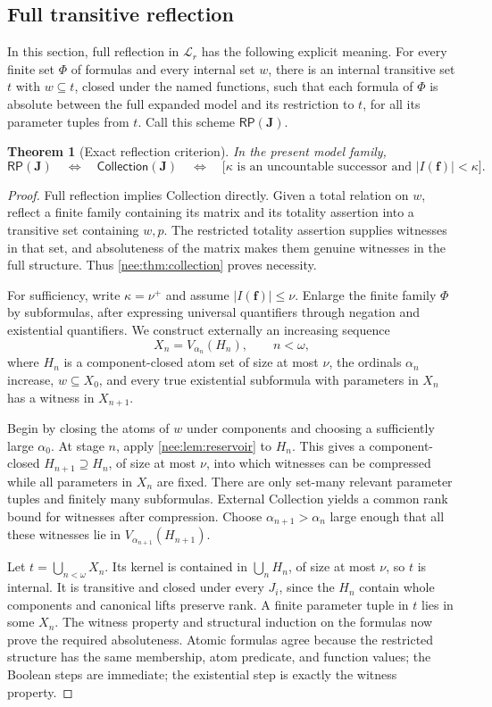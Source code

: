 \documentclass[11pt,letterpaper]{article}
\numberwithin{equation}{section}
\theoremstyle{plain}
\newtheorem{theorem}{Theorem}[section]
\theoremstyle{definition}
\theoremstyle{remark}
\newcommand{\Coll}{\mathsf{Collection}}
\newcommand{\RP}{\mathsf{RP}}
\newcommand{\Langr}{\mathcal L_r}
\begin{document}
\subsection{Full transitive reflection}
In this section, full reflection in $\Langr$ has the following explicit meaning. For every finite set $\Phi$ of formulas and every internal set $w$, there is an internal transitive set $t$ with $w\subseteq t$, closed under the named functions, such that each formula of $\Phi$ is absolute between the full expanded model and its restriction to $t$, for all its parameter tuples from $t$. Call this scheme $\RP(\boldsymbol J)$.

\begin{theorem}[Exact reflection criterion]\label{nee:thm:reflection}
In the present model family,
\[
\RP(\boldsymbol J)
\quad\Longleftrightarrow\quad
\Coll(\boldsymbol J)
\quad\Longleftrightarrow\quad
\bigl[\kappa\text{ is an uncountable successor and }|I(\boldsymbol f)|<\kappa\bigr].
\]
\end{theorem}
\begin{proof}
Full reflection implies Collection directly. Given a total relation on $w$, reflect a finite family containing its matrix and its totality assertion into a transitive set containing $w,p$. The restricted totality assertion supplies witnesses in that set, and absoluteness of the matrix makes them genuine witnesses in the full structure. Thus \cref{nee:thm:collection} proves necessity.

For sufficiency, write $\kappa=\nu^+$ and assume $|I(\boldsymbol f)|\leq\nu$. Enlarge the finite family $\Phi$ by subformulas, after expressing universal quantifiers through negation and existential quantifiers. We construct externally an increasing sequence
\[
X_n=V_{\alpha_n}(H_n),\qquad n<\omega,
\]
where $H_n$ is a component-closed atom set of size at most $\nu$, the ordinals $\alpha_n$ increase, $w\subseteq X_0$, and every true existential subformula with parameters in $X_n$ has a witness in $X_{n+1}$.

Begin by closing the atoms of $w$ under components and choosing a sufficiently large $\alpha_0$. At stage $n$, apply \cref{nee:lem:reservoir} to $H_n$. This gives a component-closed $H_{n+1}\supseteq H_n$, of size at most $\nu$, into which witnesses can be compressed while all parameters in $X_n$ are fixed. There are only set-many relevant parameter tuples and finitely many subformulas. External Collection yields a common rank bound for witnesses after compression. Choose $\alpha_{n+1}>\alpha_n$ large enough that all these witnesses lie in $V_{\alpha_{n+1}}(H_{n+1})$.

Let $t=\bigcup_{n<\omega}X_n$. Its kernel is contained in $\bigcup_nH_n$, of size at most $\nu$, so $t$ is internal. It is transitive and closed under every $J_i$, since the $H_n$ contain whole components and canonical lifts preserve rank. A finite parameter tuple in $t$ lies in some $X_n$. The witness property and structural induction on the formulas now prove the required absoluteness. Atomic formulas agree because the restricted structure has the same membership, atom predicate, and function values; the Boolean steps are immediate; the existential step is exactly the witness property.
\end{proof}
\end{document}
